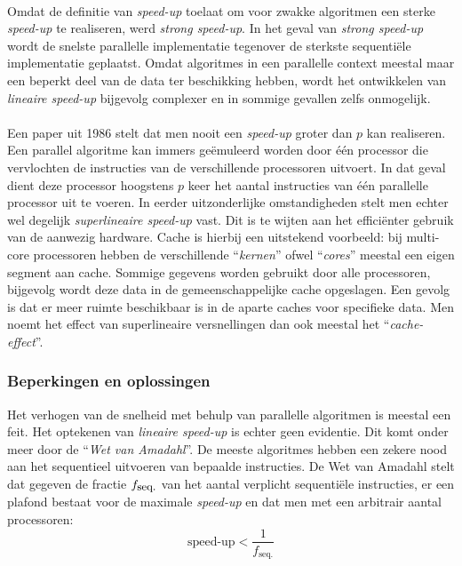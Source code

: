 \paragraph{}
Omdat de definitie van \emph{speed-up} toelaat om voor zwakke algoritmen een sterke \emph{speed-up} te realiseren, werd \emph{strong speed-up}. In het geval van \emph{strong speed-up} wordt de snelste parallelle implementatie tegenover de sterkste sequenti\"ele implementatie geplaatst. Omdat algoritmes in een parallelle context meestal maar een beperkt deel van de data ter beschikking hebben, wordt het ontwikkelen van \emph{lineaire speed-up} bijgevolg complexer en in sommige gevallen zelfs onmogelijk.\cite{Alba2005book}

\paragraph{}
Een paper uit 1986\cite{journals/pc/FaberLW86} stelt dat men nooit een \emph{speed-up} groter dan $p$ kan realiseren. Een parallel algoritme kan immers ge\"emuleerd worden door \'e\'en processor die vervlochten de instructies van de verschillende processoren uitvoert. In dat geval dient deze processor hoogstens $p$ keer het aantal instructies van \'e\'en parallelle processor uit te voeren. In eerder uitzonderlijke omstandigheden stelt men echter wel degelijk \emph{superlineaire speed-up} vast. Dit is te wijten aan het effici\"enter gebruik van de aanwezig hardware. Cache is hierbij een uitstekend voorbeeld: bij multi-core processoren hebben de verschillende ``\emph{kernen}'' ofwel ``\emph{cores}'' meestal een eigen segment aan cache. Sommige gegevens worden gebruikt door alle processoren, bijgevolg wordt deze data in de gemeenschappelijke cache opgeslagen. Een gevolg is dat er meer ruimte beschikbaar is in de aparte caches voor specifieke data. Men noemt het effect van superlineaire versnellingen dan ook meestal het ``\emph{cache-effect}''\cite{cacheEffect,superlineairspeedup,journals/pc/Janssen87,journals/pc/Parkinson86}.

\subsubsection{Beperkingen en oplossingen}

Het verhogen van de snelheid met behulp van parallelle algoritmen is meestal een feit. Het optekenen van \emph{lineaire speed-up} is echter geen evidentie. Dit komt onder meer door de ``\emph{Wet van Amadahl}''\cite{Amdahl:1967:VSP:1465482.1465560}. De meeste algoritmes hebben een zekere nood aan het sequentieel uitvoeren van bepaalde instructies. De Wet van Amadahl stelt dat gegeven de fractie $f_{\mbox{\small{seq.}}}$ van het aantal verplicht sequenti\"ele instructies, er een plafond bestaat voor de maximale \emph{speed-up} en dat men met een arbitrair aantal processoren:
\begin{equation}
\mbox{speed-up}<\displaystyle\frac{1}{f_{\mbox{seq.}}}
\end{equation}


